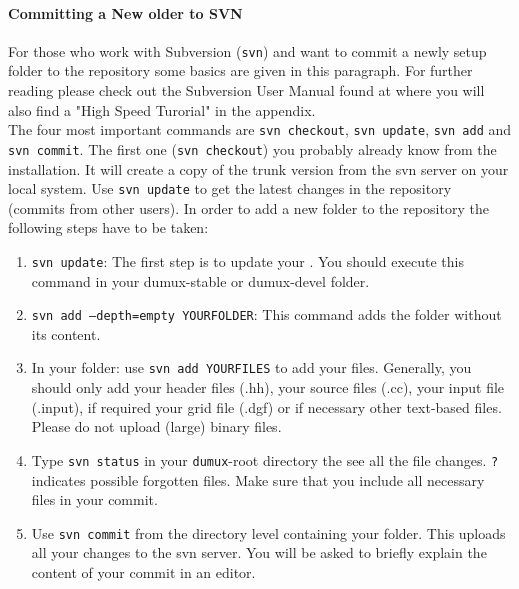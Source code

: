 \paragraph{Committing a New older to SVN}
For those who work with Subversion (\texttt{svn}) and want to commit a newly setup folder to the repository some basics are
given in this paragraph. For further reading please check out the Subversion User Manual found at \cite{APACHE-SUBVERSION-HP}
where you will also find a "High Speed Turorial" in the appendix. \\
The four most important commands are \texttt{svn checkout}, \texttt{svn update},  \texttt{svn add} 
and \texttt{svn commit}. The first one (\texttt{svn checkout}) you probably already know from the \Dumux installation.
It will create a copy of the trunk version from the svn server on your local system. Use \texttt{svn update} to get the
latest changes in the repository (commits from other users). In order to add a new folder to the repository the following
steps have to be taken:

\begin{enumerate}[1)]
\item \texttt{svn update}: The first step is to update your \Dumux. You should execute this command in your
      dumux-stable or dumux-devel folder.
\item \texttt{svn add --depth=empty YOURFOLDER}: This command adds the folder without its content.
\item In your folder: use \texttt{svn add YOURFILES} to add your files. Generally, you should only add
      your header files (.hh), your source files (.cc), your input file (.input), if required your
      grid file (.dgf) or if necessary other text-based files. Please do not upload (large) binary files.
\item Type \texttt{svn status} in your \texttt{dumux}-root directory the see all the file changes.
      \texttt{?} indicates possible forgotten files. Make sure that you include all necessary
      files in your commit.
\item Use \texttt{svn commit} from the directory level containing your folder. This uploads all your changes to the
      svn server. You will be asked to briefly explain the content of your commit in an editor.
\end{enumerate}
